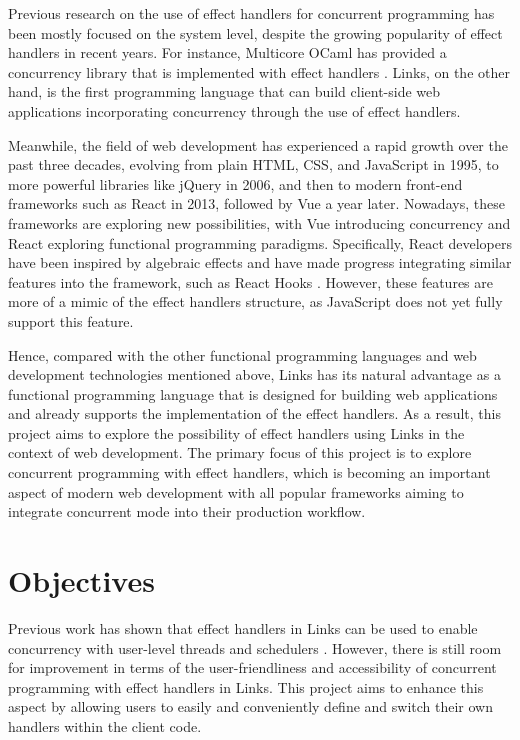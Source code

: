 \documentclass[logo,bsc,singlespacing,parskip]{infthesis}
\begin{document}
Previous research on the use of effect handlers for concurrent programming has been mostly focused on the system level, despite the growing popularity of effect handlers in recent years. For instance, Multicore OCaml has provided a concurrency library that is implemented with effect handlers \cite{stephen_2018}. Links, on the other hand, is the first programming language that can build client-side web applications incorporating concurrency through the use of effect handlers.

Meanwhile, the field of web development has experienced a rapid growth over the past three decades, evolving from plain HTML, CSS, and JavaScript in 1995, to more powerful libraries like jQuery \cite{jquery} in 2006, and then to modern front-end frameworks such as React \cite{react} in 2013, followed by Vue \cite{vue} a year later. Nowadays, these frameworks are exploring new possibilities, with Vue introducing concurrency \cite{vue_concurrency} and React exploring functional programming paradigms. Specifically, React developers have been inspired by algebraic effects and have made progress integrating similar features into the framework, such as React Hooks \cite{react_hooks}. However, these features are more of a mimic of the effect handlers structure, as JavaScript does not yet fully support this feature.

Hence, compared with the other functional programming languages and web development technologies mentioned above, Links has its natural advantage as a functional programming language that is designed for building web applications and already supports the implementation of the effect handlers. As a result, this project aims to explore the possibility of effect handlers using Links in the context of web development. The primary focus of this project is to explore concurrent programming with effect handlers, which is becoming an important aspect of modern web development with all popular frameworks aiming to integrate concurrent mode into their production workflow.

\section{Objectives}
\label{section:objectives}

Previous work has shown that effect handlers in Links can be used to enable concurrency with user-level threads and schedulers \cite{racinglines}. However, there is still room for improvement in terms of the user-friendliness and accessibility of concurrent programming with effect handlers in Links. This project aims to enhance this aspect by allowing users to easily and conveniently define and switch their own handlers within the client code.
\end{document}
